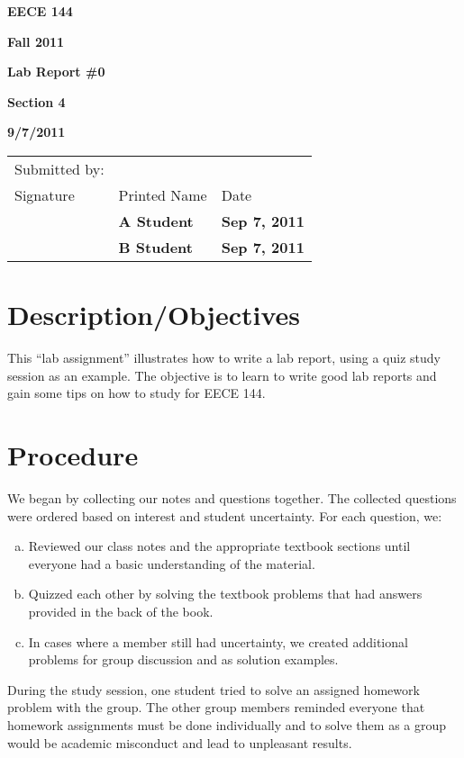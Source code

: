 \documentclass[12pt]{article}
\begin{document}

\centerline{\bf EECE 144}
\centerline{\bf Fall 2011}
\centerline{\bf}
\centerline{\bf Lab Report \#0}
\centerline{\bf Section 4}
\centerline{\bf 9/7/2011}

\begin{center}
\begin{tabularx}{\textwidth}[b]{X l l}
Submitted by: & & \\
Signature & Printed Name & Date \\
\hline
\multicolumn{1}{|X|}{} & \multicolumn{1}{|l|}{\bigstrut \bf A Student} & \multicolumn{1}{|l|}{\bf Sep 7, 2011} \\
\hline
\multicolumn{1}{|X|}{} & \multicolumn{1}{|l|}{\bigstrut \bf B Student} & \multicolumn{1}{|l|}{\bf Sep 7, 2011} \\
\hline
\end{tabularx}
\end{center}

\section{Description/Objectives}

This “lab assignment” illustrates how to write a lab report, using a quiz study
session as an example. The objective is to learn to write good lab reports and
gain some tips on how to study for EECE 144.

\section{Procedure}

We began by collecting our notes and questions together. The collected
questions were ordered based on interest and student uncertainty.
For each question, we:

\begin{enumerate}[a.]
\item Reviewed our class notes and the appropriate textbook sections until
everyone had a basic understanding of the material.
\item Quizzed each other by solving the textbook problems that had answers
provided in the back of the book.
\item In cases where a member still had uncertainty, we created additional
problems for group discussion and as solution examples.
\end{enumerate}

During the study session, one student tried to solve an assigned homework
problem with the group. The other group members reminded everyone that
homework assignments must be done individually and to solve them as a group
would be academic misconduct and lead to unpleasant results.
\end{document}
